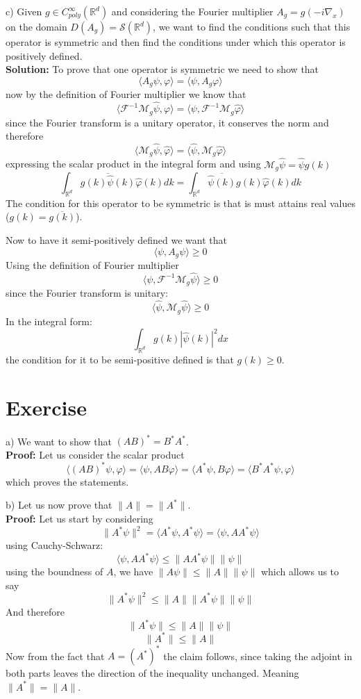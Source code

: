 \documentclass{article}
\newcommand{\R}{\mathbb{R}}
\newcommand{\F}{\mathcal F}
\newcommand{\1}{1\!\!1}
\newcommand{\sol}{\\ \textbf{Solution: }}
\newcommand{\proof}{\\ \textbf{Proof: }}
\begin{document}
c) Given $g \in C^\infty_{poly}(\R^d)$ and considering the Fourier multiplier $A_g = g (-i \nabla_x)$ on the domain $ D(A_g ) = \mathcal S (\R^d)$, we want to find the conditions such that this operator is symmetric and then find the conditions under which this operator is positively defined.
\sol To prove that one operator is symmetric we need to show that
\[
    \langle A_g \psi, \varphi \rangle = \langle \psi, A_g \varphi \rangle 
\]
now by the definition of Fourier multiplier we know that 
\[
    \langle \F^{-1} \mathcal M_g \hat\psi, \varphi \rangle = \langle \psi, \F^{-1} \mathcal M_g \hat\varphi \rangle 
\]
since the Fourier transform is a unitary operator, it conserves the norm and therefore 
\[
    \langle \mathcal M_g \hat\psi, \hat\varphi \rangle = \langle \hat\psi, \mathcal M_g \hat\varphi \rangle 
\]
expressing the scalar product in the integral form and using $\mathcal M_g \hat\psi = \hat\psi g(k)$
\[
    \int_{\R^d}\overline{ g(k) \hat\psi(k)} \hat\varphi(k) dk =  \int_{\R^d}\overline{\hat\psi(k)} g(k)  \hat\varphi(k) dk
\]
The condition for this operator to be symmetric is that is must attains real values ($ g(k) = \overline{ g(k) }$).

Now to have it semi-positively defined we want that
\[
    \langle \psi, A_g \psi \rangle \geq 0
\]
Using the definition of Fourier multiplier
\[
    \langle \psi, \F^{-1} \mathcal M_g \hat\psi \rangle \geq 0
\]
 since the Fourier transform is unitary:
\[
    \langle \hat\psi , \mathcal M_g \hat \psi \rangle \geq 0
\]
In the integral form:
\[
    \int_{\R^d} g(k) |\hat\psi (k)|^2 dx
\]
the condition for it to be semi-positive defined is that $g(k) \geq 0$.
\section{Exercise}

a) We want to show that $(AB)^* = B^* A^*$.
\proof Let us consider the scalar product
\[
    \langle (AB)^* \psi, \varphi \rangle = \langle \psi, AB \varphi \rangle = \langle A^* \psi, B\varphi \rangle = \langle B^*A^* \psi, \varphi  \rangle
\]
which proves the statements.

b) Let us now prove that $\| A \| = \|A^*\|$.
\proof Let us start by considering
\[
    \| A^* \psi \|^2 = \langle  A^* \psi, A^* \psi\rangle  = \langle  \psi, A A^* \psi\rangle
\]
using Cauchy-Schwarz:
\[
    \langle  \psi, A A^* \psi\rangle \leq \|AA^* \psi\|\|\psi\|
\]
using the boundness of $A$, we have $\|A \psi\| \leq \|A\|\|\psi\|$ which allows us to say
\[
    \| A^* \psi \|^2 \leq \|A\| \|A^* \psi\|\|\psi\|
\]
And therefore 
\[
    \| A^* \psi \| \leq \|A\| \|\psi\|
\]
\[
    \| A^* \| \leq \|A\|
\]
Now from the fact that $A = {(A^*)}^*$ the claim follows, since taking the adjoint in both parts leaves the direction of the inequality unchanged. Meaning $\| A^* \| = \| A \| $.
\end{document}
